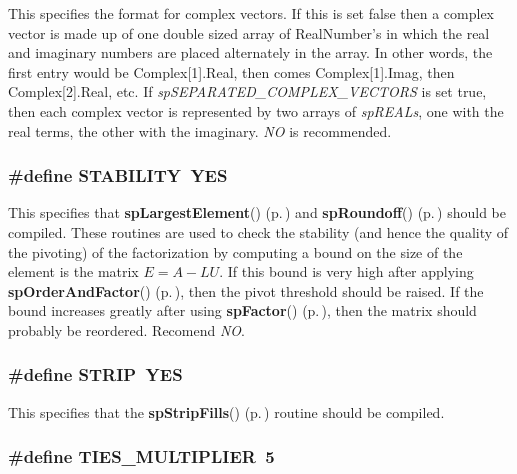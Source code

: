 This specifies the format for complex vectors. If this is set false then a complex vector is made up of one double sized array of Real\-Number's in which the real and imaginary numbers are placed alternately in the array. In other words, the first entry would be Complex[1].Real, then comes Complex[1].Imag, then Complex[2].Real, etc. If {\em sp\-SEPARATED\_\-COMPLEX\_\-VECTORS} is set true, then each complex vector is represented by two arrays of {\em sp\-REALs}, one with the real terms, the other with the imaginary. {\em NO} is recommended. 
\subsubsection{\setlength{\rightskip}{0pt plus 5cm}\#define STABILITY\ YES}\label{spConfig_8h_a16}


This specifies that {\bf sp\-Largest\-Element}() {\rm (p.\,\pageref{spUtils_8c_a22})} and {\bf sp\-Roundoff}() {\rm (p.\,\pageref{spUtils_8c_a23})} should be compiled. These routines are used to check the stability (and hence the quality of the pivoting) of the factorization by computing a bound on the size of the element is the matrix $ E = A - LU $. If this bound is very high after applying {\bf sp\-Order\-And\-Factor}() {\rm (p.\,\pageref{spFactor_8c_a24})}, then the pivot threshold should be raised. If the bound increases greatly after using {\bf sp\-Factor}() {\rm (p.\,\pageref{spFactor_8c_a25})}, then the matrix should probably be reordered. Recomend {\em NO}. 
\subsubsection{\setlength{\rightskip}{0pt plus 5cm}\#define STRIP\ YES}\label{spConfig_8h_a8}


This specifies that the {\bf sp\-Strip\-Fills}() {\rm (p.\,\pageref{spUtils_8c_a17})} routine should be compiled. 
\subsubsection{\setlength{\rightskip}{0pt plus 5cm}\#define TIES\_\-MULTIPLIER\ 5}\label{spConfig_8h_a31}


